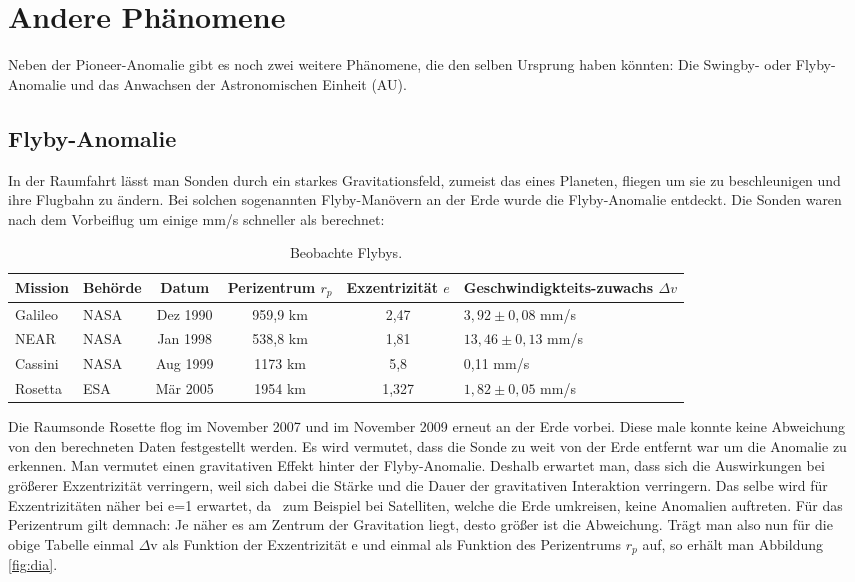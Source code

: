 \section{Andere Ph\"anomene}

Neben der Pioneer-Anomalie gibt es noch zwei weitere Ph\"anomene, die
den selben Ursprung haben k\"onnten: \foreignlanguage{ngerman}{Die}
Swingby- oder Flyby-Anomalie und das Anwachsen der Astronomischen
Einheit (AU)\cite{Laemmerzahl2006}.

\subsection{Flyby-Anomalie}

In der Raumfahrt l\"asst man Sonden durch ein starkes Gravitationsfeld,
zumeist das eines Planeten, fliegen um sie zu beschleunigen und ihre
Flugbahn zu \"andern. Bei solchen sogenannten Flyby-Man\"overn an der
Erde wurde die Flyby-Anomalie entdeckt. Die Sonden waren nach dem
Vorbeiflug um einige mm/s schneller als berechnet:


\begin{table}[htbn]
\begin{center}
\begin{tabular}{|llcccp{3cm}|}\hline
Mission & Behörde & Datum & Perizentrum $r_p$ & Exzentrizität $e$ & Geschwindigkteits-\newline zuwachs $\Delta v$ \\ \hline
Galileo & NASA & Dez 1990 & 959,9 km & 2,47 & $3,92 \pm 0,08$ mm/s \\
NEAR & NASA & Jan 1998 & 538,8 km & 1,81 & $13,46 \pm 0,13$ mm/s \\
Cassini & NASA & Aug 1999 & 1173 km & 5,8 & 0,11 mm/s \\
Rosetta & ESA & Mär 2005 & 1954 km & 1,327 & $1,82 \pm 0,05$ mm/s \\ \hline
\end{tabular}
\end{center}
\caption{Beobachte Flybys. \label{Table:flyby}}
\end{table}

Die Raumsonde Rosette flog im November 2007 und im November 2009 erneut
an der Erde vorbei. Diese male konnte keine Abweichung von den
berechneten Daten festgestellt werden. Es wird vermutet, dass die Sonde
zu weit von der Erde entfernt war um die Anomalie zu erkennen. Man
vermutet einen gravitativen Effekt hinter der Flyby-Anomalie. Deshalb
erwartet man, dass sich die Auswirkungen bei gr\"o{\ss}erer
Exzentrizit\"at verringern, weil sich dabei die St\"arke und die Dauer
der gravitativen Interaktion verringern. Das selbe wird f\"ur
Exzentrizit\"aten n\"aher bei e=1 erwartet, da \ zum Beispiel bei
Satelliten, welche die Erde umkreisen, keine Anomalien auftreten. F\"ur
das Perizentrum gilt demnach: Je n\"aher es am Zentrum der Gravitation
liegt, desto gr\"o{\ss}er ist die Abweichung. Tr\"agt man also nun
f\"ur die obige Tabelle einmal $\Delta $v als Funktion der
Exzentrizit\"at e und einmal als Funktion des Perizentrums $r_p$ auf, so
erh\"alt man Abbildung \ref{fig:dia}.


